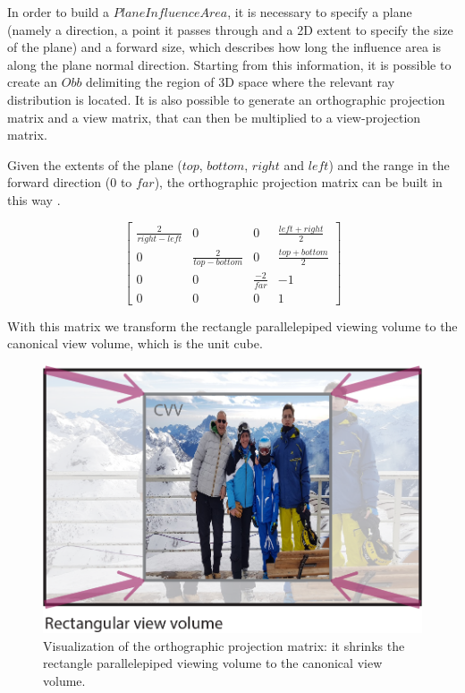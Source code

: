 \documentclass{PoliMi_MasterThesis}
\begin{document}
In order to build a $PlaneInfluenceArea$, it is necessary to specify a plane (namely a direction, a point it passes through and a 2D extent to specify the size of the plane) and a forward size, which describes how long the influence area is along the plane normal direction. Starting from this information, it is possible to create an $Obb$ delimiting the region of 3D space where the relevant ray distribution is located. It is also possible to generate an orthographic projection matrix and a view matrix, that can then be multiplied to a view-projection matrix.

Given the extents of the plane ($top$, $bottom$, $right$ and $left$) and the range in the forward direction ($0$ to $far$), the orthographic projection matrix can be built in this way \cite{matrices_3d}.

\begin{equation}
	\begin{bmatrix}
		\frac{2}{right - left} & 0 & 0 & \frac{left + right}{2} \\
		0 & \frac{2}{top - bottom} & 0 & \frac{top + bottom}{2} \\
		0 & 0 & \frac{-2}{far} & -1 \\
		0 & 0 & 0 & 1
	\end{bmatrix}
\end{equation}

With this matrix we transform the rectangle parallelepiped viewing volume to the canonical view volume, which is the unit cube.

\begin{figure}[H]
    \centering
    \includegraphics[width=\textwidth*\real{0.6}]{Images/cvv.png}
    \caption{Visualization of the orthographic projection matrix: it shrinks the rectangle parallelepiped viewing volume to the canonical view volume.}
    \label{fig:canonical_view_volume}
\end{figure}
\end{document}
